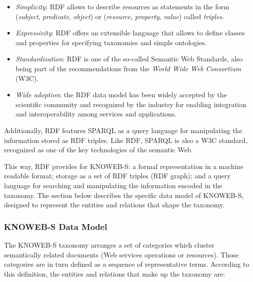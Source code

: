 \begin{itemize}
\item \emph{Simplicity}: RDF allows to describe resources as statements in the form (\emph{subject}, \emph{predicate}, \emph{object}) or (\emph{resource}, \emph{property}, \emph{value}) called \emph{triples}.
\item \emph{Expressivity}: RDF offers an extensible language that allows to define classes and properties for specifying taxonomies and simple ontologies.
\item \emph{Standardization}: RDF is one of the so-called Semantic Web Standards, also being part of the recommendations from the \emph{World Wide Web Consortium} (W3C).
\item \emph{Wide adoption}: the RDF data model has been widely accepted by the scientific community and recognized by the industry for enabling integration and interoperability among services and applications. 
\end{itemize}

Additionally, RDF features SPARQL \cite{W3C:2008} as a query language for manipulating the information stored as RDF triples. Like RDF, SPARQL is also a W3C standard, recognized as one of the key technologies of the semantic Web.

This way, RDF provides for KNOWEB-S: a formal representation in a machine readable format; storage as a set of RDF triples (RDF graph); and a query language for searching and manipulating the information encoded in the taxonomy.
The section below describes the specific data model of KNOWEB-S, designed to represent the entities and relations that shape the taxonomy.

\subsubsection{KNOWEB-S Data Model}
\label{subsub:KNOWEBS-data-model}

The KNOWEB-S taxonomy arranges a set of categories which cluster semantically related documents (Web services operations or resources). Those categories are in turn defined as a sequence of representative terms. According to this definition, the entities and relations that make up the taxonomy are:

